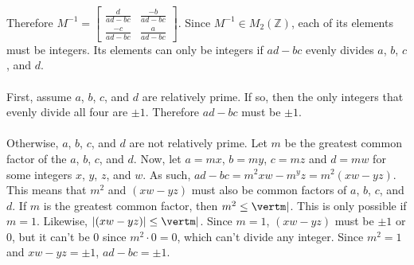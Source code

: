 \documentclass{article}
\begin{document}
\begin{enumerate}
Therefore $M^{-1} = \begin{bmatrix} \frac{d}{ad-bc} & \frac{-b}{ad-bc} \\
\frac{-c}{ad-bc} & \frac{a}{ad-bc}\end{bmatrix}$.  Since $M^{-1} \in M_2(\mathbb{Z})$,
each of its elements must be integers.  Its elements can only be
integers if $ad-bc$ evenly divides $a$, $b$, $c$, and $d$. \\
\\
First, assume $a$, $b$, $c$, and $d$ are relatively prime.  If so, then the
only integers that evenly divide all four are $\pm1$.  Therefore
${ad-bc}$ must be $\pm1$. \\
\\
Otherwise, $a$, $b$, $c$, and $d$ are not relatively prime.  Let $m$ be the
greatest common factor of the $a$, $b$, $c$, and $d$.  Now, let $a = mx$,
$b = my$, $c = mz$ and $d = mw$ for some integers $x$, $y$, $z$, and $w$.
As such, $ad - bc = m^2xw - m^yz = m^2(xw - yz)$.  This means that
$m^2$ and $(xw - yz)$ must also be common factors of $a$, $b$, $c$, and $d$.
If $m$ is the greatest common factor, then $m^2 \leq \vertm\vert$.  This is only
possible if $m = 1$.  Likewise, $\vert(xw - yz)\vert \leq \vertm\vert$.
Since $m = 1$, $(xw - yz)$ must be $\pm1$ or $0$, but it can't be $0$ since
$m^2 \cdot 0 = 0$, which can't divide any integer.  Since $m^2 = 1$ and
$xw - yz = \pm1$, $ad - bc = \pm1$. 


\end{enumerate}
\end{document}
